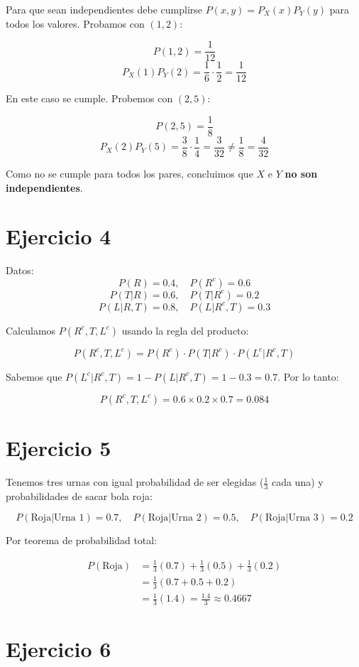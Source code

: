 \documentclass{article}
\begin{document}
Para que sean independientes debe cumplirse \(P(x,y) = P_X(x)P_Y(y)\) para todos los valores. Probamos con \((1,2)\):

\[
P(1,2) = \frac{1}{12}
\]
\[
P_X(1)P_Y(2) = \frac{1}{6} \cdot \frac{1}{2} = \frac{1}{12}
\]

En este caso se cumple. Probemos con \((2,5)\):

\[
P(2,5) = \frac{1}{8}
\]
\[
P_X(2)P_Y(5) = \frac{3}{8} \cdot \frac{1}{4} = \frac{3}{32} \neq \frac{1}{8} = \frac{4}{32}
\]

Como no se cumple para todos los pares, concluimos que \(X\) e \(Y\) \textbf{no son independientes}.

\section*{Ejercicio 4}

Datos:
\[
P(R) = 0.4, \quad P(R^c) = 0.6
\]
\[
P(T|R) = 0.6, \quad P(T|R^c) = 0.2
\]
\[
P(L|R, T) = 0.8, \quad P(L|R^c, T) = 0.3
\]

Calculamos \(P(R^c, T, L^c)\) usando la regla del producto:

\[
P(R^c, T, L^c) = P(R^c) \cdot P(T|R^c) \cdot P(L^c|R^c, T)
\]

Sabemos que \(P(L^c|R^c, T) = 1 - P(L|R^c, T) = 1 - 0.3 = 0.7\). Por lo tanto:

\[
P(R^c, T, L^c) = 0.6 \times 0.2 \times 0.7 = 0.084
\]

\section*{Ejercicio 5}

Tenemos tres urnas con igual probabilidad de ser elegidas (\(\frac{1}{3}\) cada una) y probabilidades de sacar bola roja:

\[
P(\text{Roja}|\text{Urna 1}) = 0.7,\quad P(\text{Roja}|\text{Urna 2}) = 0.5,\quad P(\text{Roja}|\text{Urna 3}) = 0.2
\]

Por teorema de probabilidad total:

\[
\begin{aligned}
P(\text{Roja}) &= \frac{1}{3}(0.7) + \frac{1}{3}(0.5) + \frac{1}{3}(0.2) \\
&= \frac{1}{3}(0.7 + 0.5 + 0.2) \\
&= \frac{1}{3}(1.4) = \frac{1.4}{3} \approx 0.4667
\end{aligned}
\]

\section*{Ejercicio 6}
\end{document}
